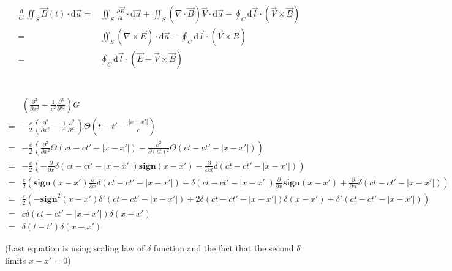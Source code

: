 \documentclass[10pt,fleqn]{article}
\newcommand{\ud}{\mathrm{d}}
\newcommand{\eqar}[1]
{
  \begin{align*}
    #1
  \end{align*}
}
\newcommand{\paren}[1]{{\left({#1}\right)}}
\newcommand{\abs}[1]{{\left|{#1}\right|}}
\newcommand{\pdiff}[3][{}]{{\frac{\partial^{#1} {#2}}{\partial {#3}{}^{#1}}}}
\newcommand{\diff}[3][{}]{{\frac{\ud^{#1} {#2}}{\ud {#3}{}^{#1}}}}
\begin{document}
\subsection{}
\eqar{
  \diff{}{t}\iint_{S}\vec B\paren{t}\cdot\ud\vec a=&\iint_{S}\pdiff{\vec B}t\cdot\ud\vec a+\iint_{S}\paren{\nabla\cdot\vec B}\vec V\cdot\ud\vec a-\oint_{C}\ud\vec l\cdot\paren{\vec V\times\vec B}\\
  =&\iint_{S}\paren{\nabla\times\vec E}\cdot\ud\vec a-\oint_{C}\ud\vec l\cdot\paren{\vec V\times\vec B}\\
  =&\oint_{C}\ud\vec l\cdot\paren{\vec E-\vec V\times\vec B}
}

\section{}
\subsection{}
\eqar{
  &\paren{\pdiff[2]{}{x}-\frac1{c^2}\pdiff[2]{}{t}}G\\
  =&-\frac{c}2\paren{\pdiff[2]{}{x}-\frac1{c^2}\pdiff[2]{}{t}}\Theta\paren{t-t'-\frac{\abs{x-x'}}{c}}\\
  =&-\frac{c}2\paren{\pdiff[2]{}{x}\Theta\paren{ct-ct'-\abs{x-x'}}-\pdiff[2]{}{(ct)}\Theta\paren{ct-ct'-\abs{x-x'}}}\\
  =&-\frac{c}2\paren{-\pdiff{}{x}\delta\paren{ct-ct'-\abs{x-x'}}\mathbf{sign}\paren{x-x'}-\pdiff{}{ct}\delta\paren{ct-ct'-\abs{x-x'}}}\\
  =&\frac{c}2\paren{\mathbf{sign}\paren{x-x'}\pdiff{}{x}\delta\paren{ct-ct'-\abs{x-x'}}+\delta\paren{ct-ct'-\abs{x-x'}}\pdiff{}{x}\mathbf{sign}\paren{x-x'}+\pdiff{}{ct}\delta\paren{ct-ct'-\abs{x-x'}}}\\
  =&\frac{c}2\paren{-\mathbf{sign}^2\paren{x-x'}\delta'\paren{ct-ct'-\abs{x-x'}}+2\delta\paren{ct-ct'-\abs{x-x'}}\delta\paren{x-x'}+\delta'\paren{ct-ct'-\abs{x-x'}}}\\
  =&c\delta\paren{ct-ct'-\abs{x-x'}}\delta\paren{x-x'}\\
  =&\delta\paren{t-t'}\delta\paren{x-x'}
}
(Last equation is using scaling law of $\delta$ function and the fact that the second $\delta$ limits $x-x'=0$)
\end{document}
